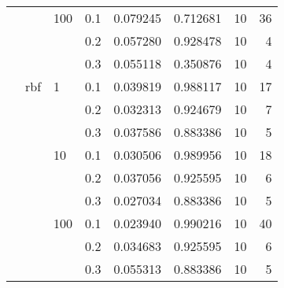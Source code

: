 \begin{table}[H]
\begin{tabular}{llllrrrr}
       &     & 100 & 0.1 &     0.079245 &  0.712681 &        10 &    36 \\
       &     &     & 0.2 &     0.057280 &  0.928478 &        10 &     4 \\
       &     &     & 0.3 &     0.055118 &  0.350876 &        10 &     4 \\
       & rbf & 1   & 0.1 &     0.039819 &  0.988117 &        10 &    17 \\
       &     &     & 0.2 &     0.032313 &  0.924679 &        10 &     7 \\
       &     &     & 0.3 &     0.037586 &  0.883386 &        10 &     5 \\
       &     & 10  & 0.1 &     0.030506 &  0.989956 &        10 &    18 \\
       &     &     & 0.2 &     0.037056 &  0.925595 &        10 &     6 \\
       &     &     & 0.3 &     0.027034 &  0.883386 &        10 &     5 \\
       &     & 100 & 0.1 &     0.023940 &  0.990216 &        10 &    40 \\
       &     &     & 0.2 &     0.034683 &  0.925595 &        10 &     6 \\
       &     &     & 0.3 &     0.055313 &  0.883386 &        10 &     5 \\
\bottomrule
\end{tabular}
\end{table}
